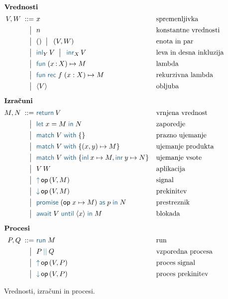 \begin{figure}[H]

	\centering
	\small
	\begin{align*}
	\intertext{\textbf{Vrednosti}}
	V, W
	\bnfis& x                                       & &\text{spremenljivka} \\
	\bnfor& n    							        & &\text{konstantne vrednosti} \\
	\bnfor& \tmunit \bnfor\! \tmpair{V}{W}          & &\text{enota in par} \\
	\bnfor& \tminl[Y]{V} \bnfor\! \tminr[X]{V}      & &\text{leva in desna inkluzija} \\
	\bnfor& \tmfun{x \of X}{M}                      & &\text{lambda} \\
	\bnfor& \tmfunrec{f}{x : X}{M}                  & &\text{rekurzivna lambda} \\
	\bnfor& \tmpromise V                            & &\text{obljuba}
	\\[1ex]
	\intertext{\textbf{Izračuni}}
	M, N
	\bnfis& \tmreturn{V}                            & &\text{vrnjena vrednost} \\
	\bnfor& \tmlet{x}{M}{N}                         & &\text{zaporedje} \\
	\bnfor& \tmmatch[]{V}{}                         & &\text{prazno ujemanje} \\
	\bnfor& \tmmatch{V}{\tmpair{x}{y} \mapsto M}    & &\text{ujemanje produkta} \\
	\bnfor& \tmmatch{V}{\tminl{x} \mapsto M, \tminr{y} \mapsto N}	& &\text{ujemanje vsote} \\
	\bnfor& V\,W                                    & &\text{aplikacija} \\
	\bnfor& \tmopout{op}{V}{M}       & &\text{signal} \\
	\bnfor& \tmopin{op}{V}{M}          & &\text{prekinitev} \\
	\bnfor& \tmwith{op}{x}{M}{p}{N}      & &\text{prestreznik} \\
	\bnfor& \tmawait{V}{x}{M}             & &\text{blokada}
		\\[1ex]
	\intertext{\textbf{Procesi}}
 	P, Q
	\bnfis & \tmrun M & & \text{run} \\
	\bnfor & \tmpar P Q & & \text{vzporedna procesa} \\
	\bnfor & \tmopout{op}{V}{P} & & \text{proces signal} \\
	\bnfor & \tmopin{op}{V}{P} & & \text{proces prekinitev}
	\end{align*}

	\caption{Vrednosti, izračuni in procesi.}
	\label{fig:izrazi}
\end{figure}


